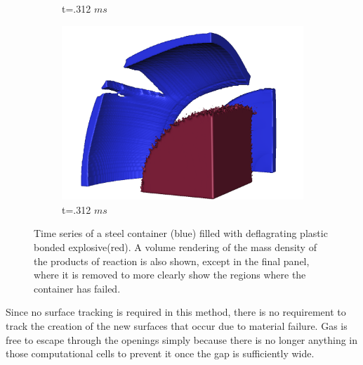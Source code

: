 \begin{figure}[t!]
\begin{subfigure}[b]{0.3\textwidth}
   \caption{t=.312 $ms$}
   \label{figCookoff:e}
 \end{subfigure}
 \begin{subfigure}[b]{0.3\textwidth}
   \includegraphics[width=\textwidth]{Figs/mpmice/NE_172_d.png}
   \caption{t=.312 $ms$}
   \label{figCookoff:f}
 \end{subfigure}
 \caption{Time series of a steel container (blue) filled with deflagrating 
          plastic bonded explosive(red).  A volume rendering of the mass 
          density of the products of reaction is also shown, except in the 
          final panel, where it is removed to more clearly show the regions 
          where the container has failed. }
 \label{figCookoff}
 \end{figure}

Since no surface tracking is required in this method, there is no
requirement to track the creation of the new surfaces that occur
due to material failure.  Gas is free to escape through the openings
simply because there is no longer anything in those computational
cells to prevent it once the gap is sufficiently wide.

